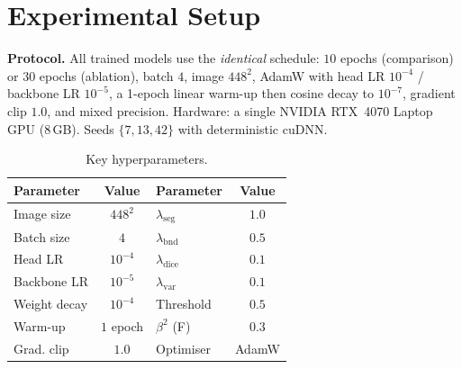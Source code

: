 \section{Experimental Setup}
\textbf{Protocol.} All trained models use the \emph{identical} schedule: $10$
epochs (comparison) or $30$ epochs (ablation), batch $4$, image $448^2$, AdamW
\cite{loshchilov2019adamw} with head LR $10^{-4}$ / backbone LR $10^{-5}$, a
1-epoch linear warm-up then cosine decay \cite{loshchilov2017sgdr} to $10^{-7}$,
gradient clip $1.0$, and mixed precision. Hardware: a single NVIDIA RTX~4070
Laptop GPU (8\,GB). Seeds $\{7,13,42\}$ with deterministic cuDNN.

\begin{table}[t]
\centering
\caption{Key hyperparameters.}
\label{tab:hparams}
\begin{tabular}{lc@{\hskip 1.4em}lc}
\toprule
Parameter & Value & Parameter & Value \\
\midrule
Image size & $448^2$ & $\lambda_{\mathrm{seg}}$ & $1.0$ \\
Batch size & $4$ & $\lambda_{\mathrm{bnd}}$ & $0.5$ \\
Head LR & $10^{-4}$ & $\lambda_{\mathrm{dice}}$ & $0.1$ \\
Backbone LR & $10^{-5}$ & $\lambda_{\mathrm{var}}$ & $0.1$ \\
Weight decay & $10^{-4}$ & Threshold & $0.5$ \\
Warm-up & $1$ epoch & $\beta^2$ (F) & $0.3$ \\
Grad. clip & $1.0$ & Optimiser & AdamW \\
\bottomrule
\end{tabular}
\end{table}

